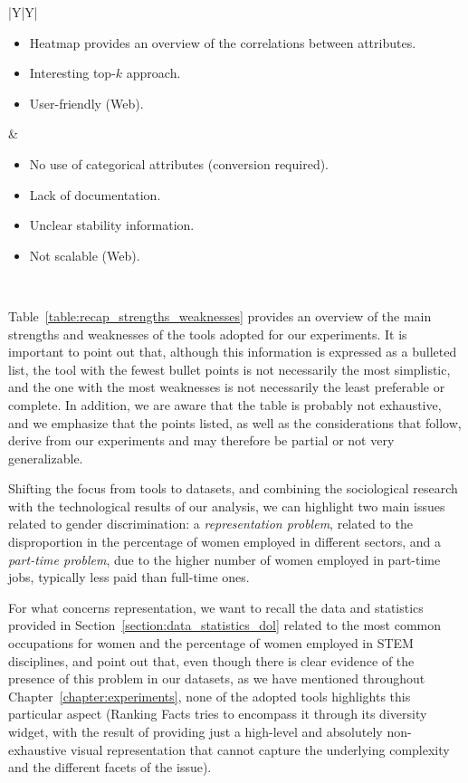 \begin{table}[t!]
\begin{tabularx}{\columnwidth}{|Y|Y|}
\begin{itemize}[topsep=0pt,leftmargin=*]
\item \nohyphens{Heatmap provides an overview of the correlations between attributes.}
\item \nohyphens{Interesting top-\(k\) approach.}
\item \nohyphens{User-friendly (Web).}
\end{itemize} & \begin{itemize}[topsep=0pt,leftmargin=*]
\item \nohyphens{No use of categorical attributes (conversion required).}
\item \nohyphens{Lack of documentation.} \newline\newline
\item \nohyphens{Unclear stability information.}
\item \nohyphens{Not scalable (Web).}
\end{itemize}\\
\hline
\end{tabularx}
\centering
\caption{Recap of the strengths and weaknesses of the tools used for the experiments.}
\label{table:recap_strengths_weaknesses}
\end{table}

Table~\ref{table:recap_strengths_weaknesses} provides an overview of the main strengths and weaknesses of the tools adopted for our experiments. It is important to point out that, although this information is expressed as a bulleted list, the tool with the fewest bullet points is not necessarily the most simplistic, and the one with the most weaknesses is not necessarily the least preferable or complete. In addition, we are aware that the table is probably not exhaustive, and we emphasize that the points listed, as well as the considerations that follow, derive from our experiments and may therefore be partial or not very generalizable.

Shifting the focus from tools to datasets, and combining the sociological research with the technological results of our analysis, we can highlight two main issues related to gender discrimination: a \textit{representation problem}, related to the disproportion in the percentage of women employed in different sectors, and a \textit{part-time problem}, due to the higher number of women employed in part-time jobs, typically less paid than full-time ones.

For what concerns representation, we want to recall the data and statistics provided in Section~\ref{section:data_statistics_dol} related to the most common occupations for women and the percentage of women employed in STEM disciplines, and point out that, even though there is clear evidence of the presence of this problem in our datasets, as we have mentioned throughout Chapter~\ref{chapter:experiments}, none of the adopted tools highlights this particular aspect (Ranking Facts tries to encompass it through its diversity widget, with the result of providing just a high-level and absolutely non-exhaustive visual representation that cannot capture the underlying complexity and the different facets of the issue).

